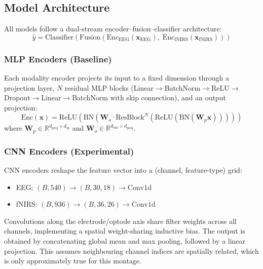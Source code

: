 \documentclass[conference]{IEEEtran}
\begin{document}
\subsection{Model Architecture}
All models follow a dual-stream encoder--fusion--classifier architecture:
\begin{equation}
    \hat{y} = \mathrm{Classifier}(\mathrm{Fusion}(\mathrm{Enc}_{\mathrm{EEG}}(\mathbf{x}_{\mathrm{EEG}}),\; \mathrm{Enc}_{\mathrm{fNIRS}}(\mathbf{x}_{\mathrm{fNIRS}})))
\end{equation}

\subsubsection{MLP Encoders (Baseline)}
Each modality encoder projects its input to a fixed dimension through a projection layer, $N$ residual MLP blocks (Linear$\to$BatchNorm$\to$ReLU$\to$Dropout$\to$Linear$\to$BatchNorm with skip connection), and an output projection:
\begin{equation}
    \mathrm{Enc}(\mathbf{x}) = \mathrm{ReLU}(\mathrm{BN}(\mathbf{W}_o \cdot \mathrm{ResBlock}^N(\mathrm{ReLU}(\mathrm{BN}(\mathbf{W}_p \mathbf{x})))))
\end{equation}
where $\mathbf{W}_p \in \mathbb{R}^{d_{\mathrm{proj}} \times d_{\mathrm{in}}}$ and $\mathbf{W}_o \in \mathbb{R}^{d_{\mathrm{enc}} \times d_{\mathrm{proj}}}$.

\subsubsection{CNN Encoders (Experimental)}
CNN encoders reshape the feature vector into a (channel, feature-type) grid:
\begin{itemize}
    \item EEG: $(B, 540) \to (B, 30, 18) \to \mathrm{Conv1d}$
    \item fNIRS: $(B, 936) \to (B, 36, 26) \to \mathrm{Conv1d}$
\end{itemize}
Convolutions along the electrode/optode axis share filter weights across all channels, implementing a spatial weight-sharing inductive bias. The output is obtained by concatenating global mean and max pooling, followed by a linear projection. This assumes neighbouring channel indices are spatially related, which is only approximately true for this montage.
\end{document}
